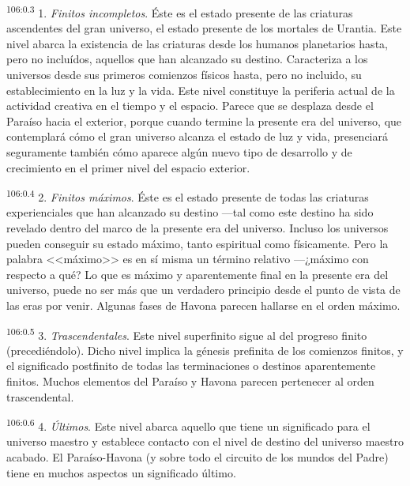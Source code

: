 \documentclass[twoside, 11pt]{book}
\begin{document}
\par
\textsuperscript{106:0.3} 1. \textit{Finitos incompletos}. Éste es el estado presente de las criaturas ascendentes del gran universo, el estado presente de los mortales de Urantia. Este nivel abarca la existencia de las criaturas desde los humanos planetarios hasta, pero no incluídos, aquellos que han alcanzado su destino. Caracteriza a los universos desde sus primeros comienzos físicos hasta, pero no incluido, su establecimiento en la luz y la vida. Este nivel constituye la periferia actual de la actividad creativa en el tiempo y el espacio. Parece que se desplaza desde el Paraíso hacia el exterior, porque cuando termine la presente era del universo, que contemplará cómo el gran universo alcanza el estado de luz y vida, presenciará seguramente también cómo aparece algún nuevo tipo de desarrollo y de crecimiento en el primer nivel del espacio exterior.

\par
\textsuperscript{106:0.4} 2. \textit{Finitos máximos}. Éste es el estado presente de todas las criaturas experienciales que han alcanzado su destino ---tal como este destino ha sido revelado dentro del marco de la presente era del universo. Incluso los universos pueden conseguir su estado máximo, tanto espiritual como físicamente. Pero la palabra <<máximo>> es en sí misma un término relativo ---¿máximo con respecto a qué? Lo que es máximo y aparentemente final en la presente era del universo, puede no ser más que un verdadero principio desde el punto de vista de las eras por venir. Algunas fases de Havona parecen hallarse en el orden máximo.

\par
\textsuperscript{106:0.5} 3. \textit{Trascendentales}. Este nivel superfinito sigue al del progreso finito (precediéndolo). Dicho nivel implica la génesis prefinita de los comienzos finitos, y el significado postfinito de todas las terminaciones o destinos aparentemente finitos. Muchos elementos del Paraíso y Havona parecen pertenecer al orden trascendental.

\par
\textsuperscript{106:0.6} 4. \textit{Últimos}. Este nivel abarca aquello que tiene un significado para el universo maestro y establece contacto con el nivel de destino del universo maestro acabado. El Paraíso-Havona (y sobre todo el circuito de los mundos del Padre) tiene en muchos aspectos un significado último.
\end{document}
